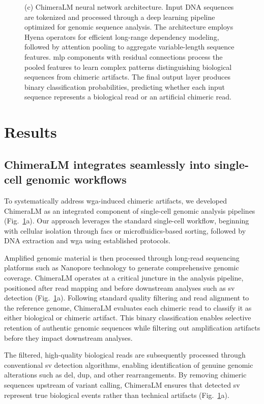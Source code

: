 \documentclass[pdflatex,sn-nature]{sn-jnl}%
\theoremstyle{thmstyleone}%
\theoremstyle{thmstyletwo}%
\theoremstyle{thmstylethree}%
\begin{document}
\begin{figure}[!ht]
{		(c) ChimeraLM neural network architecture. Input DNA sequences are tokenized and processed through a deep learning pipeline optimized for genomic sequence analysis. The architecture employs Hyena operators for efficient long-range dependency modeling, followed by attention pooling to aggregate variable-length sequence features. \gls{mlp} components with residual connections process the pooled features to learn complex patterns distinguishing biological sequences from chimeric artifacts. The final output layer produces binary classification probabilities, predicting whether each input sequence represents a biological read or an artificial chimeric read.} \label{fig:figure1}
\end{figure}

\section*{Results}\label{sec:results}

\subsection*{ChimeraLM integrates seamlessly into single-cell genomic workflows}

To systematically address \gls{wga}-induced chimeric artifacts, we developed ChimeraLM as an integrated component of single-cell genomic analysis pipelines (Fig.~\ref{fig:figure1}a).
Our approach leverages the standard single-cell workflow, beginning with cellular isolation through \gls{facs} or microfluidics-based sorting, followed by DNA extraction and \gls{wga} using established protocols.

Amplified genomic material is then processed through long-read sequencing platforms such as Nanopore technology to generate comprehensive genomic coverage.
ChimeraLM operates at a critical juncture in the analysis pipeline, positioned after read mapping and before downstream analyses such as \gls{sv} detection (Fig.~\ref{fig:figure1}a).
Following standard quality filtering and read alignment to the reference genome, ChimeraLM evaluates each chimeric read to classify it as either biological or chimeric artifact.
This binary classification enables selective retention of authentic genomic sequences while filtering out amplification artifacts before they impact downstream analyses.

The filtered, high-quality biological reads are subsequently processed through conventional \gls{sv} detection algorithms, enabling identification of genuine genomic alterations such as \gls{del}, \gls{dup}, and other rearrangements.
By removing chimeric sequences upstream of variant calling, ChimeraLM ensures that detected \gls{sv} represent true biological events rather than technical artifacts (Fig.~\ref{fig:figure1}a).
\end{document}

